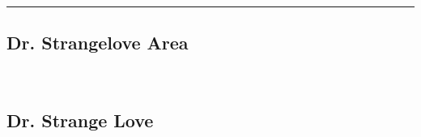 \rule{\textwidth}{1pt}
\begin{multicols}{2}
		\section{Dr. Strangelove Area}\label{sa:Dr. Strangelove Area}
	\begin{minipage}{\columnwidth}
	\
	\end{minipage}
			\subsection*{Dr. Strange Love}\label{bf:Dr. Strange Love}
			\begin{minipage}{\columnwidth}
			\
			\end{minipage}
			
\end{multicols}
\clearpage